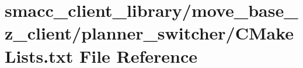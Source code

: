 \hypertarget{client__library_2move__base__z__client_2planner__switcher_2CMakeLists_8txt}{}\section{smacc\+\_\+client\+\_\+library/move\+\_\+base\+\_\+z\+\_\+client/planner\+\_\+switcher/\+C\+Make\+Lists.txt File Reference}
\label{client__library_2move__base__z__client_2planner__switcher_2CMakeLists_8txt}
